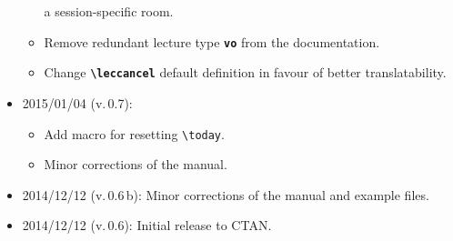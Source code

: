 \documentclass[english]{article}
\newcommand*\jmacro[1]{\textbf{\texttt{#1}}}
\newcommand*\jcsmacro[1]{\jmacro{\textbackslash{#1}}}
\newcommand*\joption[1]{\textbf{\texttt{#1}}}
\newcommand*\jfmacro[1]{\texttt{#1}}
\newcommand*\jfcsmacro[1]{\jfmacro{\textbackslash{#1}}}
\begin{document}
\begin{itemize}
\begin{itemize}
             a session-specific room.
       \item Remove redundant lecture type \joption{vo} from the documentation.
       \item Change \jcsmacro{leccancel} default definition in favour of better
             translatability.
    \end{itemize}\filbreak
\item 2015/01/04 (v.\,0.7):
    \begin{itemize}
       \item Add macro for resetting \jfcsmacro{today}.
       \item Minor corrections of the manual.
    \end{itemize}
\item 2014/12/12 (v.\,0.6\,b): Minor corrections of the manual and example files.
\item 2014/12/12 (v.\,0.6): Initial release to CTAN.
\end{itemize}
\end{document}
